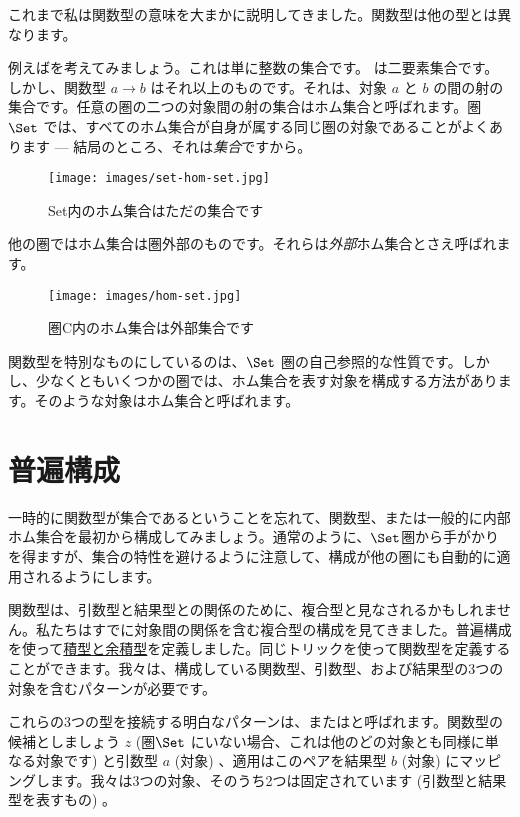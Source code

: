 
\lettrine[lhang=0.17]{こ}{れまで}私は関数型の意味を大まかに説明してきました。関数型は他の型とは異なります。

例えばを考えてみましょう。これは単に整数の集合です。
は二要素集合です。しかし、関数型 $a\to b$ はそれ以上のものです。それは、対象 $a$ と $b$ の間の射の集合です。任意の圏の二つの対象間の射の集合はホム集合と呼ばれます。圏 $\Set$ では、すべてのホム集合が自身が属する同じ圏の対象であることがよくあります  --- 結局のところ、それは\emph{集合}ですから。

\begin{figure}[H]
  \centering
  \texttt{[image: images/set-hom-set.jpg]}
  \caption{Set内のホム集合はただの集合です}
\end{figure}

\noindent
他の圏ではホム集合は圏外部のものです。それらは\emph{外部}ホム集合とさえ呼ばれます。

\begin{figure}[H]
  \centering
  \texttt{[image: images/hom-set.jpg]}
  \caption{圏C内のホム集合は外部集合です}
\end{figure}

\noindent
関数型を特別なものにしているのは、$\Set$ 圏の自己参照的な性質です。しかし、少なくともいくつかの圏では、ホム集合を表す対象を構成する方法があります。そのような対象はホム集合と呼ばれます。

\section{普遍構成}

一時的に関数型が集合であるということを忘れて、関数型、または一般的に内部ホム集合を最初から構成してみましょう。通常のように、$\Set$圏から手がかりを得ますが、集合の特性を避けるように注意して、構成が他の圏にも自動的に適用されるようにします。

関数型は、引数型と結果型との関係のために、複合型と見なされるかもしれません。私たちはすでに対象間の関係を含む複合型の構成を見てきました。普遍構成を使って\hyperref[products-and-coproducts]{積型と余積型}を定義しました。同じトリックを使って関数型を定義することができます。我々は、構成している関数型、引数型、および結果型の3つの対象を含むパターンが必要です。

これらの3つの型を接続する明白なパターンは、またはと呼ばれます。関数型の候補としましょう $z$ (圏$\Set$ にいない場合、これは他のどの対象とも同様に単なる対象です) と引数型 $a$ (対象) 、適用はこのペアを結果型 $b$ (対象) にマッピングします。我々は3つの対象、そのうち2つは固定されています (引数型と結果型を表すもの) 。

